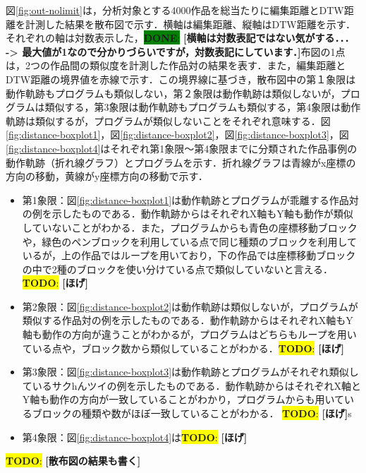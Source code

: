\documentclass[T,J]{fose} %
\newcommand{\todo}[1]{\colorbox{yellow}{{\bf TODO}:}{\color{red} {\textbf{[#1]}}}}
\newcommand{\done}[2]{\colorbox{green}{{\bf DONE}:} {\textbf{[#1]}}}
\begin{document}
図\ref{fig:out-nolimit}は，分析対象とする4000作品を総当たりに編集距離とDTW距離を計測した結果を散布図で示す．横軸は編集距離、縦軸はDTW距離を示す．それぞれの軸は対数表示した，\done{横軸は対数表記ではない気がする．．． -> 最大値が1なので分かりづらいですが，対数表記にしています．}散布図の1点は，2つの作品間の類似度を計測した作品対の結果を表す．また，編集距離とDTW距離の境界値を赤線で示す．この境界線に基づき，散布図中の第１象限は動作軌跡もプログラムも類似しない，第２象限は動作軌跡は類似しないが，プログラムは類似する，第3象限は動作軌跡もプログラムも類似する，第4象限は動作軌跡は類似するが，プログラムが類似しないことをそれぞれ意味する．図\ref{fig:distance-boxplot1}，図\ref{fig:distance-boxplot2}，図\ref{fig:distance-boxplot3}，図\ref{fig:distance-boxplot4}はそれぞれ第1象限〜第4象限までに分類された作品事例の動作軌跡（折れ線グラフ）とプログラムを示す．折れ線グラフは青線がx座標の方向の移動，黄線がy座標方向の移動で示す．

\begin{itemize}
\item 第1象限：図\ref{fig:distance-boxplot1}は動作軌跡とプログラムが乖離する作品対の例を示したものである．動作軌跡からはそれぞれX軸もY軸も動作が類似していないことがわかる．また，プログラムからも青色の座標移動ブロックや，緑色のペンブロックを利用している点で同じ種類のブロックを利用しているが，上の作品ではループを用いており，下の作品では座標移動ブロックの中で2種のブロックを使い分けている点で類似していないと言える．\todo{ほげ}
\item 第2象限：図\ref{fig:distance-boxplot2}は動作軌跡は類似しないが，プログラムが類似する作品対の例を示したものである．動作軌跡からはそれぞれX軸もY軸も動作の方向が違うことがわかるが，プログラムはどちらもループを用いている点や，ブロック数から類似していることがわかる．\todo{ほげ}
\item 第3象限：図\ref{fig:distance-boxplot3}は動作軌跡とプログラムがそれぞれ類似しているサクhんツイの例を示したものである．動作軌跡からはそれぞれX軸とY軸も動作の方向が一致していることがわかり，プログラムからも用いているブロックの種類や数がほぼ一致していることがわかる．
\todo{ほげ}s
\item 第4象限：図\ref{fig:distance-boxplot4}は\todo{ほげ}
\end{itemize}

\todo{散布図の結果も書く}

\end{document}
